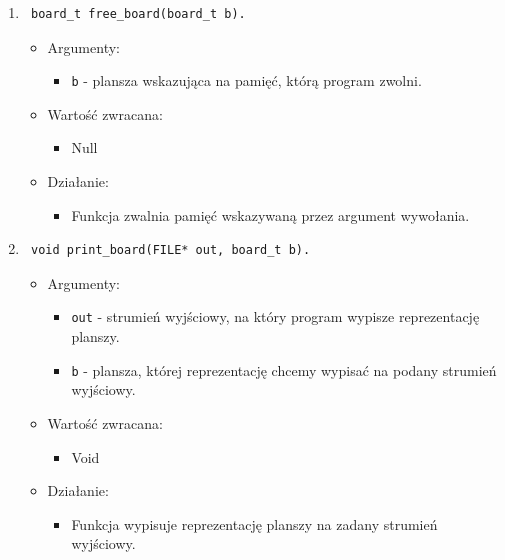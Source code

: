 \documentclass[a4paper,11pt, notitlepage ]{article}
\begin{document}
\begin{enumerate}
\item \begin{verbatim} board_t free_board(board_t b). \end{verbatim}
\begin{itemize}
\item Argumenty:
\begin{itemize}
\item \verb+b+ - plansza wskazująca na pamięć, którą program zwolni.
\end{itemize}
\item Wartość zwracana:
\begin{itemize}
\item Null
\end{itemize}
\item Działanie:
\begin{itemize}
\item Funkcja zwalnia pamięć wskazywaną przez argument wywołania.
\end{itemize}
\end{itemize}


\item \begin{verbatim} void print_board(FILE* out, board_t b). \end{verbatim}
\begin{itemize}
\item Argumenty:
\begin{itemize}
\item \verb+out+ - strumień wyjściowy, na który program wypisze reprezentację planszy.
\item \verb+b+ - plansza, której reprezentację chcemy wypisać na podany strumień wyjściowy.
\end{itemize}
\item Wartość zwracana:
\begin{itemize}
\item Void
\end{itemize}
\item Działanie:
\begin{itemize}
\item Funkcja wypisuje reprezentację planszy na zadany strumień wyjściowy.
\end{itemize}
\end{itemize}
\end{enumerate}
\end{document}
